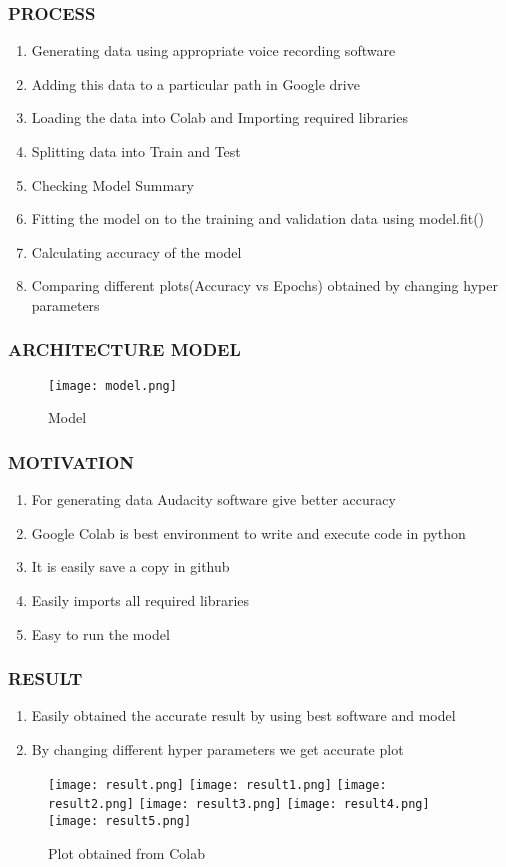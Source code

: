 \documentclass{beamer}
\begin{document}
\begin{frame}
\frametitle{PROCESS}
\begin{enumerate}
 \item Generating data using appropriate voice recording software 
  \item Adding this data to a particular path in Google drive
  \item Loading the data into Colab and Importing required libraries
  \item Splitting data into Train and Test
  \item Checking Model Summary
  \item Fitting the model on to the training and validation data using model.fit()
  \item Calculating accuracy of the model
  \item Comparing different plots(Accuracy vs Epochs) obtained by changing hyper parameters
\end{enumerate}
\end{frame}
\begin{frame}
\frametitle{ARCHITECTURE MODEL}
\begin{figure}
    \centering
    \texttt{[image: model.png]}
    \caption{Model}
    \label{fig:my_label}
\end{figure}
\end{frame}
\begin{frame}
\frametitle{MOTIVATION}   
 \begin{enumerate}
 \item For generating data Audacity software give better accuracy
 \item Google Colab is best environment to write and execute code in python
 \item It is easily save a copy in github
 \item Easily imports all required libraries
 \item Easy to run the model
 \end{enumerate}
\end{frame}
\begin{frame}
  \frametitle{RESULT} 
  \begin{enumerate}
      \item Easily obtained the accurate result by using best software and model 
      \item By changing different hyper parameters we get accurate plot
  \end{enumerate}
  \begin{figure}
      \centering
      \texttt{[image: result.png]}
      \texttt{[image: result1.png]}
      \texttt{[image: result2.png]}
      \texttt{[image: result3.png]}
      \texttt{[image: result4.png]}
      \texttt{[image: result5.png]}
      \caption{Plot obtained from Colab}
      \label{fig:my_label}
  \end{figure}
\end{frame}
\end{document}
